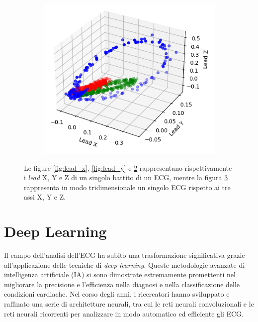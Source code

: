 \documentclass[12pt,italian]{report}
\begin{document}
\begin{figure}[H]
\begin{subfigure}{0.4\textwidth}
\begin{subfigure}{\textwidth}
				\caption{}
				\label{fig:lead_z}
			\end{subfigure}
		\end{subfigure}
		\begin{subfigure}{0.55\textwidth}
			\centering
			\includegraphics[width=1\linewidth]{immagini/frank3d.png}
			\captionsetup{justification=centering}
			\caption{}
			\label{fig:frank3d}
		\end{subfigure}
		\captionsetup{justification=centering}
		\caption{Le figure \ref{fig:lead_x}, \ref{fig:lead_y} e \ref{fig:lead_z} rappresentano rispettivamente i \textit{lead} X, Y e Z di un singolo battito di un ECG, mentre la figura \ref{fig:frank3d} rappresenta in modo tridimensionale un singolo ECG rispetto ai tre assi X, Y e Z.}
		\label{fig:ecg}
	\end{figure}
	
	
	\section{Deep Learning}
	\label{sec:deep}
	
	Il campo dell'analisi dell'ECG ha subito una trasformazione significativa grazie all'applicazione delle tecniche di \textit{deep learning}. Queste metodologie avanzate di intelligenza artificiale (IA) si sono dimostrate estremamente promettenti nel migliorare la precisione e l'efficienza nella diagnosi e nella classificazione delle condizioni cardiache. Nel corso degli anni, i ricercatori hanno sviluppato e raffinato una serie di architetture neurali, tra cui le reti neurali convoluzionali e le reti neurali ricorrenti per analizzare in modo automatico ed efficiente gli ECG.
	
\end{document}
